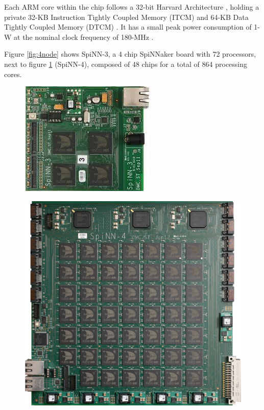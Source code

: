 Each ARM core within the chip follows a 32-bit Harvard Architecture \cite{arm9manual}, holding a private 32-KB Instruction Tightly Coupled Memory (ITCM) and 64-KB Data Tightly Coupled Memory (DTCM) \cite{painkras}. It has a small peak power consumption of 1-W at the nominal clock frequency of 180-MHz \cite{arm968}.

Figure \ref{fig:4node} shows SpiNN-3, a 4 chip SpiNNaker board with 72 processors, next to figure \ref{fig:48node} (SpiNN-4), composed of 48 chips for a total of 864 processing cores.

\begin{figure}
\centering
\begin{minipage}{.48\textwidth}
  \centering
  \includegraphics[width=0.4\linewidth, natwidth=245, natheight=205]{images/4node.jpg}
  \label{fig:4node}
\end{minipage}
\begin{minipage}{.48\textwidth}
  \centering
  \includegraphics[width=0.9\linewidth, natwidth=945, natheight=896]{images/48node.jpg}
  \label{fig:48node}
\end{minipage}
\end{figure}

